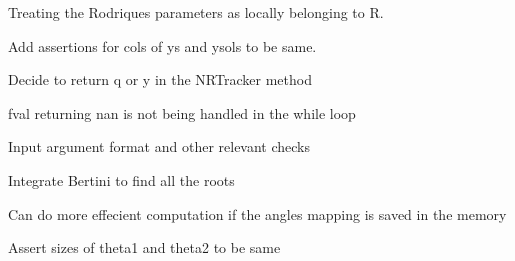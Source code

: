 \begin{DoxyRefList}
Treating the Rodriques parameters as locally belonging to R. 

Add assertions for cols of ys and ysols to be same.  
\item[Member \mbox{\hyperlink{classRootTracker_a6bb3dcb73ea58ac44ab15d7803de3d5a}{Root\+Tracker::N\+R\+Tracker}} (Vector\+Xd x, Vector\+Xd y, std\+::function$<$ Vector\+Xd(\+Vector\+Xd)$>$ f, std\+::function$<$ Matrix\+Xd(\+Vector\+Xd)$>$ Jfy, double eps=pow(10, -\/10))]\label{todo__todo000002}%
%
Decide to return q or y in the N\+R\+Tracker method 

fval returning nan is not being handled in the while loop 

Input argument format and other relevant checks  
\item[Member \mbox{\hyperlink{classRootTracker_ada1cf0e1ae31392f075fe5f92972f17f}{Root\+Tracker::Singularity\+Event\+Identifier}} (Vector\+Xd ys, Matrix\+Xd ysols, int index, double eps=pow(10, -\/2))]\label{todo__todo000005}%
%
Integrate Bertini to find all the roots  
\item[Member \mbox{\hyperlink{utils_8hh_aa55cfeada673b3ce1ce1e504925e117c}{s1\+Dist}} (Vector\+Xd theta1, Vector\+Xd theta2)]\label{todo__todo000009}%
%
Can do more effecient computation if the angles mapping is saved in the memory 

Assert sizes of theta1 and theta2 to be same 
\end{DoxyRefList}